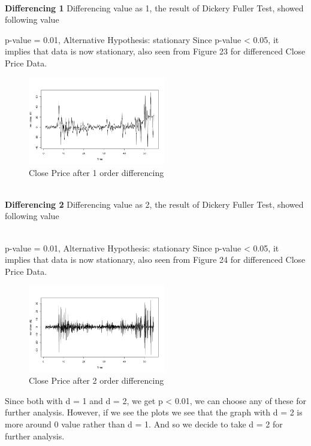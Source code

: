 \documentclass{article}
\begin{document}
\\ \textbf{Differencing 1}
Differencing value as 1, the result of Dickery Fuller Test, showed following value

p-value = 0.01, Alternative Hypothesis: stationary 
Since p-value < 0.05, it implies that data is now stationary, also seen from Figure 23 for differenced Close Price Data.

\begin{figure}[ht]
	\centering
	\includegraphics[width=6cm]{CloseWithDifferencing1.png}
	\caption{Close Price after 1 order differencing}
	\label{fig:Close Price after 1 order differencing}
\end{figure}

\\ \textbf{Differencing 2}
Differencing value as 2, the result of Dickery Fuller Test, showed following value

\\ p-value = 0.01, Alternative Hypothesis: stationary
Since p-value < 0.05, it implies that data is now stationary, also seen from Figure 24 for differenced Close Price Data.

\begin{figure}[ht]
	\centering
	\includegraphics[width=6cm]{CloseWithDifferencing2.png}
	\caption{Close Price after 2 order differencing}
	\label{fig:Close Price after 2 order differencing}
\end{figure}


Since both with d = 1 and d = 2, we get p < 0.01, we can choose any of these for further analysis. However, if we see the plots we see that the graph with d = 2 is more around 0 value rather than d = 1. And so we 
decide to take d = 2 for further analysis.
\end{document}
